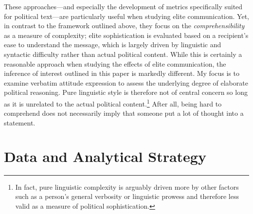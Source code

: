 These approaches---and especially the development of metrics specifically suited for political text---are particularly useful when studying elite communication. Yet, in contrast to the framework outlined above, they focus on the \textit{comprehensibility} as a measure of complexity; elite sophistication is evaluated based on a recipient's ease to understand the message, which is largely driven by linguistic and syntactic difficulty rather than actual political content. While this is certainly a reasonable approach when studying the effects of elite communication, the inference of interest outlined in this paper is markedly different. My focus is to examine verbatim attitude expression to assess the underlying degree of elaborate political reasoning. Pure linguistic style is therefore not of central concern so long as it is unrelated to the actual political content.\footnote{In fact, pure linguistic complexity is arguably driven more by other factors such as a person's general verbosity or linguistic prowess and therefore less valid as a measure of political sophistication.} After all, being hard to comprehend does not necessarily imply that someone put a lot of thought into a statement.



\section*{Data and Analytical Strategy}

